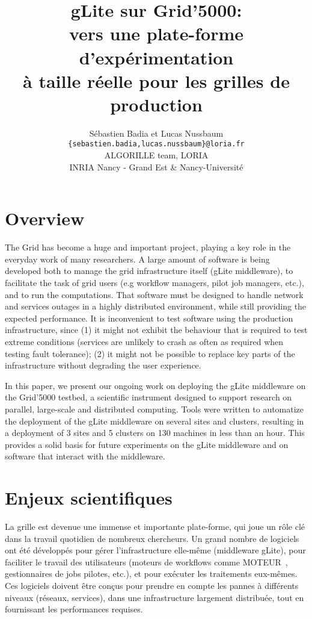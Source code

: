 \documentclass[a4paper,11pt]{article}
\title{gLite sur Grid'5000:\\ vers une plate-forme d'expérimentation\\ à taille réelle pour les grilles de production}
\date{}
\author{Sébastien Badia et Lucas Nussbaum\\
\texttt{\normalsize \{sebastien.badia,lucas.nussbaum\}@loria.fr}\\[1em]
\normalsize ALGORILLE team, LORIA\\
INRIA Nancy - Grand Est \& Nancy-Université}
\begin{document}
\maketitle

\section{Overview}

The Grid has become a huge and important project, playing a key role in the
everyday work of many researchers. A large amount of software is being developed
both to manage the grid infrastructure itself (gLite middleware),
to facilitate the task of grid users (e.g workflow managers,
pilot job managers, etc.), and to run the computations.
That software must be designed to handle network and services outages in a
highly distributed environment, while still providing the expected performance.
It is inconvenient to test software using the production infrastructure, since
(1) it might not exhibit the behaviour that is required to test extreme
conditions (services are unlikely to crash as often as required when testing
fault tolerance); (2) it might not be possible to replace key parts of the
infrastructure without degrading the user experience.

In this paper, we present our ongoing work on deploying the gLite middleware on
the Grid'5000 testbed, a scientific instrument designed to support research on
parallel, large-scale and distributed computing. Tools were written to
automatize the deployment of the gLite middleware on several sites and
clusters, resulting in a deployment of 3 sites and 5 clusters on 130 machines
in less than an hour.  This provides a solid basis for future experiments on
the gLite middleware and on software that interact with the middleware.

\section{Enjeux scientifiques}

La grille est devenue une immense et importante plate-forme, qui joue un rôle
clé dans la travail quotidien de nombreux chercheurs. Un grand nombre de
logiciels ont été développés pour gérer l'infrastructure elle-même (middleware
gLite\cite{glite}), pour faciliter le travail des utilisateurs (moteurs de
workflows comme MOTEUR~\cite{moteur}, gestionnaires de jobs pilotes, etc.), et
pour exécuter les traitements eux-mêmes.
Ces logiciels doivent être conçus pour prendre en compte les pannes à
différents niveaux (réseaux, services), dans une infrastructure largement
distribuée, tout en fournissant les performances requises.
\end{document}
